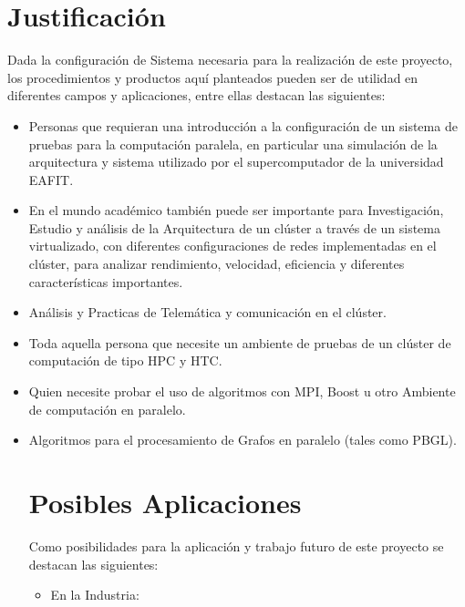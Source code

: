 \section{Justificación}

Dada la configuración de Sistema necesaria para la realización de este proyecto, los procedimientos y productos aquí planteados pueden ser de utilidad en diferentes campos y aplicaciones, entre ellas destacan las siguientes:  

\begin{itemize}
	
	\item Personas que requieran una introducción a la configuración de un sistema de pruebas para la computación paralela, en particular una simulación de la arquitectura y sistema utilizado por el supercomputador de la universidad EAFIT.

	\item En el mundo académico también puede ser importante para Investigación, Estudio y análisis de la Arquitectura de un clúster a través de un sistema virtualizado, con diferentes configuraciones de redes implementadas en el clúster, para analizar rendimiento, velocidad, eficiencia y diferentes características importantes. 


	\item Análisis y Practicas de Telemática y comunicación en el clúster. 

	\item Toda aquella persona que necesite un ambiente de pruebas de un clúster de computación  de tipo HPC y HTC.

	\item Quien necesite probar el uso de algoritmos con MPI, Boost u otro Ambiente de computación en paralelo.

	\item Algoritmos para el procesamiento de Grafos en paralelo (tales como PBGL).

	\newpage

	\section{Posibles Aplicaciones}

	Como posibilidades para la aplicación y trabajo futuro de este proyecto se destacan las siguientes: 

	\begin{itemize}
		\item En la Industria:


\end{itemize}
\end{itemize}
